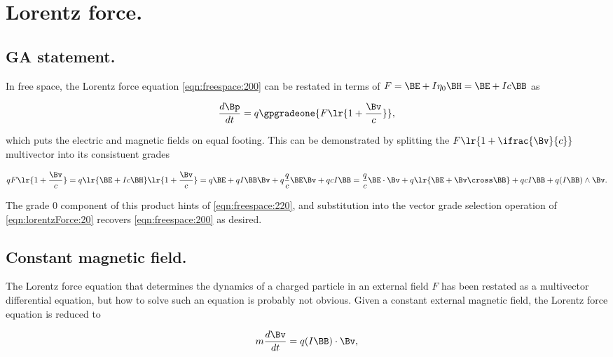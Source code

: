 %
%
\section{Lorentz force.}
\subsection{GA statement.}
In free space, the Lorentz force equation \cref{eqn:freespace:200}
can be restated
in terms of \( F = \BE + I \eta_0 \BH = \BE + I c \BB \) as

\begin{dmath}\label{eqn:lorentzForce:20}
\frac{d\Bp}{dt} = q \gpgradeone{ F \lr{ 1 + \frac{\Bv}{c} } },
\end{dmath}

which puts the electric and magnetic fields on equal footing.
This can be demonstrated by splitting the \( F \lr{ 1 + \ifrac{\Bv}{c} } \) multivector into its consistuent grades

\begin{dmath}\label{eqn:lorentzForce:40}
q F \lr{ 1 + \frac{\Bv}{c} }
=
q
\lr{ \BE + I c \BH }
\lr{ 1 + \frac{\Bv}{c} }
=
q \BE + q I \BB \Bv
+ q \frac{q}{c} \BE \Bv
+ q c I \BB
=
  \frac{q}{c} \BE \cdot \Bv
+ q \lr{ \BE + \Bv \cross \BB }
+ q c I \BB
+ q (I \BB) \wedge \Bv.
\end{dmath}

The grade 0 component of this product hints of \cref{eqn:freespace:220}, and substitution into the vector grade selection operation of \cref{eqn:lorentzForce:20} recovers \cref{eqn:freespace:200} as desired.

\subsection{Constant magnetic field.}

The Lorentz force equation that determines the dynamics of a charged particle in an external field \( F \) has been restated as a multivector differential equation, but how to solve such an equation is probably not obvious.
Given a constant external magnetic field, the Lorentz force equation is reduced to

\begin{dmath}\label{eqn:lorentzForce:60}
m \frac{d\Bv}{dt} = q (I \BB) \cdot \Bv,
\end{dmath}

